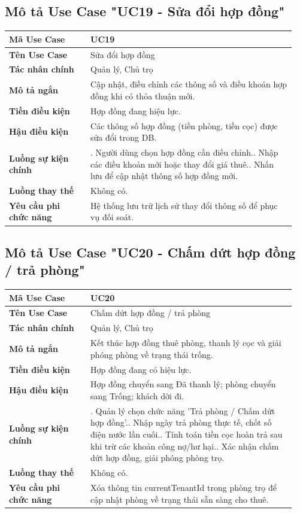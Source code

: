 \subsection{Mô tả Use Case "UC19 - Sửa đổi hợp đồng"}

\begin{longtable}[]{@{}>{\RaggedRight\arraybackslash}p{0.27\linewidth}>{\RaggedRight\arraybackslash}p{0.68\linewidth}@{}}
\toprule
\textbf{Mã Use Case} & UC19\tabularnewline
\midrule
\endhead
\textbf{Tên Use Case} & Sửa đổi hợp đồng\tabularnewline
\textbf{Tác nhân chính} & Quản lý, Chủ trọ\tabularnewline
\textbf{Mô tả ngắn} & Cập nhật, điều chỉnh các thông số và điều khoản
hợp đồng khi có thỏa thuận mới.\tabularnewline
\textbf{Tiền điều kiện} & Hợp đồng đang hiệu lực.\tabularnewline
\textbf{Hậu điều kiện} & Các thông số hợp đồng (tiền phòng, tiền cọc)
được sửa đổi trong DB.\tabularnewline
\textbf{Luồng sự kiện chính} & 1. Người dùng chọn hợp
đồng cần điều chỉnh.\newline 2. Nhập các điều khoản mới hoặc thay
đổi giá thuê.\newline 3. Nhấn lưu để cập nhật thông số hợp đồng
mới.\tabularnewline
\textbf{Luồng thay thế} & Không có.\tabularnewline
\textbf{Yêu cầu phi chức năng} & Hệ thống lưu trữ lịch sử thay đổi thông
số để phục vụ đối soát.\tabularnewline
\bottomrule
\end{longtable}

\subsection{Mô tả Use Case "UC20 - Chấm dứt hợp đồng / trả phòng"}

\begin{longtable}[]{@{}>{\RaggedRight\arraybackslash}p{0.27\linewidth}>{\RaggedRight\arraybackslash}p{0.68\linewidth}@{}}
\toprule
\textbf{Mã Use Case} & UC20\tabularnewline
\midrule
\endhead
\textbf{Tên Use Case} & Chấm dứt hợp đồng / trả phòng\tabularnewline
\textbf{Tác nhân chính} & Quản lý, Chủ trọ\tabularnewline
\textbf{Mô tả ngắn} & Kết thúc hợp đồng thuê phòng, thanh lý cọc và giải
phóng phòng về trạng thái trống.\tabularnewline
\textbf{Tiền điều kiện} & Hợp đồng đang có hiệu lực.\tabularnewline
\textbf{Hậu điều kiện} & Hợp đồng chuyển sang Đã thanh lý; phòng chuyển
sang Trống; khách dời đi.\tabularnewline
\textbf{Luồng sự kiện chính} & 1. Quản lý chọn chức
năng 'Trả phòng / Chấm dứt hợp đồng'.\newline 2. Nhập ngày trả
phòng thực tế, chốt số điện nước lần cuối.\newline 3. Tính toán
tiền cọc hoàn trả sau khi trừ các khoản công nợ/hư hại.\newline 4.
Xác nhận chấm dứt hợp đồng, giải phóng phòng trọ.\tabularnewline
\textbf{Luồng thay thế} & Không có.\tabularnewline
\textbf{Yêu cầu phi chức năng} & Xóa thông tin currentTenantId trong
phòng trọ để cập nhật phòng về trạng thái sẵn sàng cho
thuê.\tabularnewline
\bottomrule
\end{longtable}

